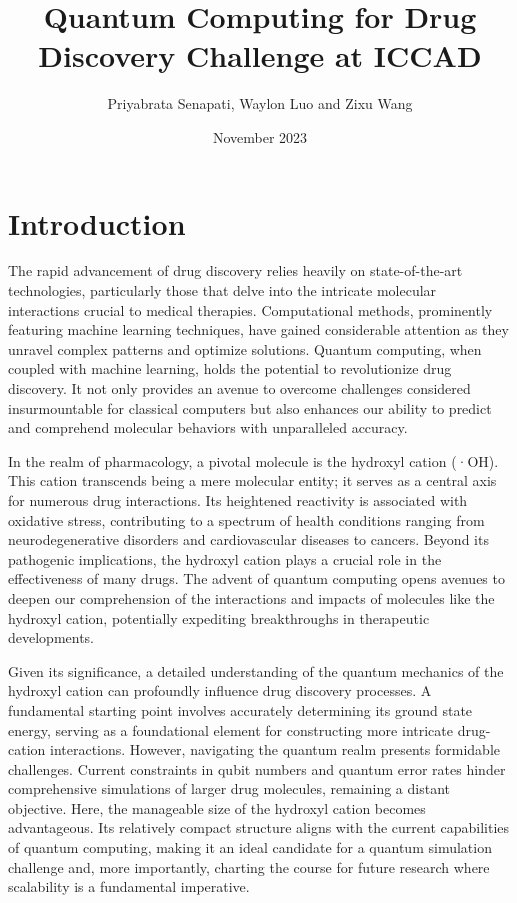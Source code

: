 \documentclass{article}
\title{Quantum Computing for Drug Discovery Challenge at ICCAD}
\author{Priyabrata Senapati, Waylon Luo and Zixu Wang}
\date{November 2023}
\begin{document}
\maketitle

\section{Introduction}

The rapid advancement of drug discovery relies heavily on state-of-the-art technologies, particularly those that delve into the intricate molecular interactions crucial to medical therapies. Computational methods, prominently featuring machine learning techniques, have gained considerable attention as they unravel complex patterns and optimize solutions. Quantum computing, when coupled with machine learning, holds the potential to revolutionize drug discovery. It not only provides an avenue to overcome challenges considered insurmountable for classical computers but also enhances our ability to predict and comprehend molecular behaviors with unparalleled accuracy\cite{Cao2018}.

In the realm of pharmacology, a pivotal molecule is the hydroxyl cation (·OH). This cation transcends being a mere molecular entity; it serves as a central axis for numerous drug interactions. Its heightened reactivity is associated with oxidative stress, contributing to a spectrum of health conditions ranging from neurodegenerative disorders and cardiovascular diseases to cancers. Beyond its pathogenic implications, the hydroxyl cation plays a crucial role in the effectiveness of many drugs. The advent of quantum computing opens avenues to deepen our comprehension of the interactions and impacts of molecules like the hydroxyl cation, potentially expediting breakthroughs in therapeutic developments.

Given its significance, a detailed understanding of the quantum mechanics of the hydroxyl cation can profoundly influence drug discovery processes. A fundamental starting point involves accurately determining its ground state energy, serving as a foundational element for constructing more intricate drug-cation interactions. However, navigating the quantum realm presents formidable challenges. Current constraints in qubit numbers and quantum error rates hinder comprehensive simulations of larger drug molecules, remaining a distant objective. Here, the manageable size of the hydroxyl cation becomes advantageous. Its relatively compact structure aligns with the current capabilities of quantum computing, making it an ideal candidate for a quantum simulation challenge and, more importantly, charting the course for future research where scalability is a fundamental imperative.
\end{document}
